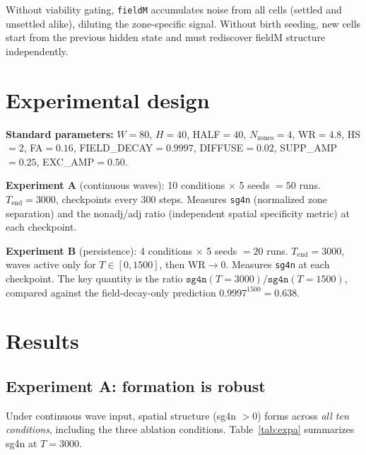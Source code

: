 \documentclass[11pt,a4paper]{article}
\begin{document}
Without viability gating, \texttt{fieldM} accumulates noise from all cells (settled and
unsettled alike), diluting the zone-specific signal.  Without birth seeding, new cells
start from the previous hidden state and must rediscover fieldM structure independently.

\section{Experimental design}

\textbf{Standard parameters:} $W{=}80$, $H{=}40$, HALF$=40$, $N_\text{zones}{=}4$,
WR$=4.8$, HS$=2$, FA$=0.16$, FIELD\_DECAY$=0.9997$, DIFFUSE$=0.02$, SUPP\_AMP$=0.25$,
EXC\_AMP$=0.50$.

\textbf{Experiment A} (continuous waves): 10 conditions $\times$ 5 seeds $= 50$ runs.
$T_\text{end}{=}3000$, checkpoints every 300 steps.  Measures \texttt{sg4n} (normalized
zone separation) and the nonadj/adj ratio (independent spatial specificity metric) at
each checkpoint.

\textbf{Experiment B} (persistence): 4 conditions $\times$ 5 seeds $= 20$ runs.
$T_\text{end}{=}3000$, waves active only for $T \in [0, 1500]$, then WR$\to 0$.
Measures \texttt{sg4n} at each checkpoint.  The key quantity is the ratio
$\texttt{sg4n}(T{=}3000) / \texttt{sg4n}(T{=}1500)$, compared against the field-decay-only
prediction $0.9997^{1500} = 0.638$.

\section{Results}

\subsection{Experiment A: formation is robust}

Under continuous wave input, spatial structure (sg4n $> 0$) forms across \emph{all ten
conditions}, including the three ablation conditions.  Table~\ref{tab:expa} summarizes
sg4n at $T{=}3000$.
\end{document}
